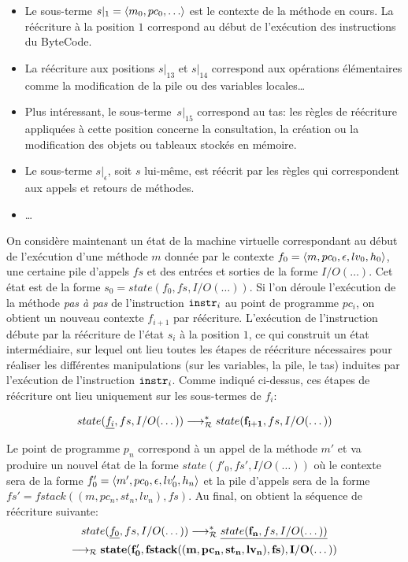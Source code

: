 \begin{itemize}
\item Le sous-terme $s|_1 = \la m_0, pc_0, \dots \ra$ est le contexte
  de la méthode en cours. La réécriture à la position $1$ correspond au début de
  l'exécution des instructions du ByteCode.

\item La réécriture aux positions $s|_{13}$ et $s|_{14}$ correspond
  aux opérations élémentaires comme la modification de la pile ou des
  variables locales\dots
  
\item Plus intéressant, le sous-terme~$s|_{15}$ correspond au tas: les
  règles de réécriture appliquées à cette position concerne la
  consultation, la création ou la modification des objets ou tableaux
  stockés en mémoire.

\item Le sous-terme $s|_\epsilon$, soit $s$ lui-même, est réécrit par les
  règles qui correspondent aux appels et retours de méthodes.
\item \dots
\end{itemize}

On considère maintenant un état de la machine virtuelle correspondant
au début de l'exécution d'une méthode $m$ donnée par le contexte $f_0 =
\langle m, pc_0, \epsilon, lv_0, h_0\rangle$, une certaine pile d'appels $fs$
et des entrées et sorties de la forme $I/O(\dots)$.  Cet état est de la
forme $s_0 = state(f_0, fs, I/O(\dots))$. Si l'on déroule l'exécution de
la méthode \emph{pas à pas} de l'instruction $\mathtt{instr}_i$ au point de
programme $pc_i$, on obtient un nouveau contexte $f_{i+1}$ par
réécriture. L'exécution de l'instruction débute par la réécriture de
l'état $s_i$ à la position $1$, ce qui construit un état intermédiaire, sur
lequel ont lieu toutes les étapes de réécriture nécessaires pour
réaliser les différentes manipulations (sur les variables, la pile, le
tas) induites par l'exécution de l'instruction $\mathtt{instr}_i$. Comme
indiqué ci-dessus, ces étapes de réécriture ont lieu uniquement sur
les sous-termes de $f_i$: %

\[ state(\underline{f_i}, fs, I/O(\dots)) \longrightarrow_\mathcal R^* state(\mathbf{f_{i+1}}, fs, I/O(\dots)) \]

Le point de programme $p_n$ correspond à un appel de la méthode
$m'$ et va produire un nouvel état de la forme $state(f'_0, fs',
I/O(\dots))$ où le contexte sera de la forme $f'_0 = \langle m', pc_0,
\epsilon, lv'_0, h_n \rangle$ et la pile d'appels sera de la forme $fs' = fstack((m, pc_n, st_n,
lv_n), fs)$. Au final, on obtient la séquence de réécriture suivante:
\begin{multline*}
  state(\underline{f_0}, fs, I/O(\dots)) \longrightarrow_\mathcal R^* \underline{state(\mathbf{f_n}, fs, I/O(\dots))} \\
  \longrightarrow_\mathcal R \mathbf{state(f'_0, fstack((m, pc_n, st_n, lv_n), fs), I/O(\dots))}  
\end{multline*}

